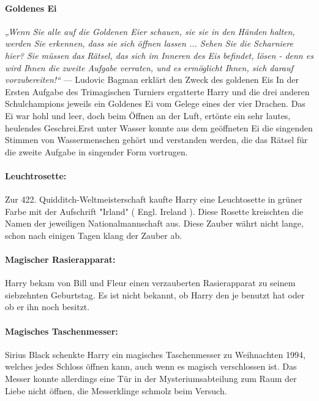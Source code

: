 \documentclass[a4paper, 10pt]{article}
\begin{document}
\paragraph{Goldenes Ei}
\textit{„Wenn Sie alle auf die Goldenen Eier schauen, sie sie in den Händen halten, werden Sie erkennen, dass sie sich öffnen lassen ... Sehen Sie die Scharniere hier? Sie müssen das Rätsel, das sich im Inneren des Eis befindet, lösen - denn es wird Ihnen die zweite Aufgabe verraten, und es ermöglicht Ihnen, sich darauf vorzubereiten!“}
\vspace{10pt}
\newline
— Ludovic Bagman erklärt den Zweck des goldenen Eis
\vspace{10pt}
\newline
In der Ersten Aufgabe des Trimagischen Turniers ergatterte Harry und die drei anderen Schulchampions jeweils ein Goldenes Ei vom Gelege eines der vier Drachen. Das Ei war hohl und leer, doch beim Öffnen an der Luft, ertönte ein sehr lautes, heulendes Geschrei.Erst unter Wasser konnte aus dem geöffneten Ei die singenden Stimmen von Wassermenschen gehört und verstanden werden, die das Rätsel für die zweite Aufgabe in singender Form vortrugen.

\paragraph{Leuchtrosette:}
Zur 422. Quidditch-Weltmeisterschaft kaufte Harry eine Leuchtosette in grüner Farbe mit der Aufschrift "Irland" (  Engl.  Ireland ). Diese Rosette kreischten die Namen der jeweiligen Nationalmannschaft aus. Diese Zauber währt nicht lange, schon nach einigen Tagen klang der Zauber ab.
\paragraph{Magischer Rasierapparat:}
Harry bekam von Bill und Fleur einen verzauberten Rasierapparat zu seinem siebzehnten Geburtstag. Es ist nicht bekannt, ob Harry den je benutzt hat oder ob er ihn noch besitzt.
\paragraph{Magisches Taschenmesser:}
Sirius Black schenkte Harry ein magisches Taschenmesser zu Weihnachten 1994, welches jedes Schloss öffnen kann, auch wenn es magisch verschlossen ist. Das Messer konnte allerdings eine Tür in der Mysteriumsabteilung zum Raum der Liebe nicht öffnen, die Messerklinge schmolz beim Versuch.
\end{document}

